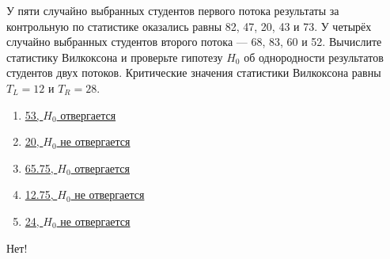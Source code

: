 \documentclass[t]{beamer}
\begin{document}
 \begin{frame} \label{61-No} 
\begin{block}{61} 

У пяти случайно выбранных студентов первого потока результаты за контрольную по статистике оказались равны  82, 47, 20, 43 и 73. У четырёх случайно выбранных студентов второго потока — 68, 83, 60 и 52. Вычислите статистику Вилкоксона и проверьте гипотезу $H_0$ об однородности результатов студентов двух потоков. Критические значения статистики Вилкоксона равны $T_L=12$ и $T_R=28$.
 


 \end{block} 
\begin{enumerate} 
\item[] \hyperlink{61-No}{\beamergotobutton{} 53, $H_0$ отвергается}
\item[] \hyperlink{61-No}{\beamergotobutton{} 20, $H_0$ не отвергается}
\item[] \hyperlink{61-No}{\beamergotobutton{} 65.75, $H_0$ отвергается}
\item[] \hyperlink{61-No}{\beamergotobutton{} 12.75, $H_0$ не отвергается}
\item[] \hyperlink{61-Yes}{\beamergotobutton{} 24, $H_0$ не отвергается}
\end{enumerate} 

 \alert{Нет!} 
\end{frame} 
\end{document}
